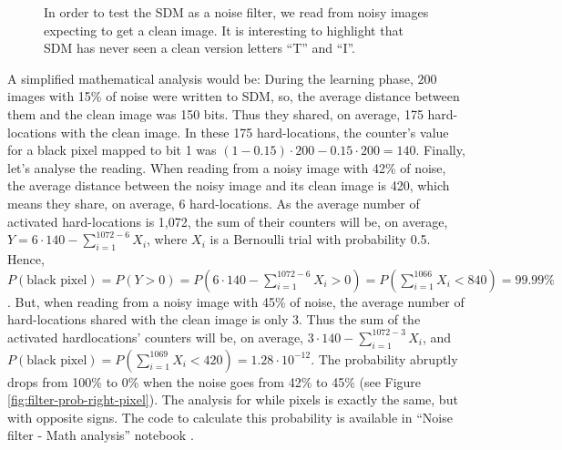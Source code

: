 \begin{figure}[!htb]


  \caption{In order to test the SDM as a noise filter, we read from noisy images expecting to get a clean image. It is interesting to highlight that SDM has never seen a clean version letters ``T'' and ``I''.
  \label{fig:filter-testing}
  }
\end{figure}

A simplified mathematical analysis would be: During the learning phase, $200$ images with 15\% of noise were written to SDM, so, the average distance between them and the clean image was 150 bits. Thus they shared, on average, 175 hard-locations with the clean image. In these 175 hard-locations, the counter's value for a black pixel mapped to bit 1 was $(1-0.15) \cdot 200 - 0.15 \cdot 200 = 140$. Finally, let's analyse the reading. When reading from a noisy image with 42\% of noise, the average distance between the noisy image and its clean image is 420, which means they share, on average, 6 hard-locations. As the average number of activated hard-locations is 1,072, the sum of their counters will be, on average, $Y = 6 \cdot 140 - \sum_{i=1}^{1072-6} X_i$, where $X_i$ is a Bernoulli trial with probability 0.5. Hence, $P(\text{black pixel}) = P(Y > 0) = P(6 \cdot 140 - \sum_{i=1}^{1072-6} X_i > 0) = P(\sum_{i=1}^{1066} X_i < 840) = 99.99\%$. But, when reading from a noisy image with 45\% of noise, the average number of hard-locations shared with the clean image is only 3. Thus the sum of the activated hardlocations' counters will be, on average, $3 \cdot 140 - \sum_{i=1}^{1072-3} X_i$, and $P(\text{black pixel}) = P(\sum_{i=1}^{1069} X_i < 420) = 1.28 \cdot 10^{-12}$. The probability abruptly drops from 100\% to 0\% when the noise goes from 42\% to 45\% (see Figure \ref{fig:filter-prob-right-pixel}). The analysis for while pixels is exactly the same, but with opposite signs. The code to calculate this probability is available in ``Noise filter - Math analysis'' notebook \citep{sdmframework}.

